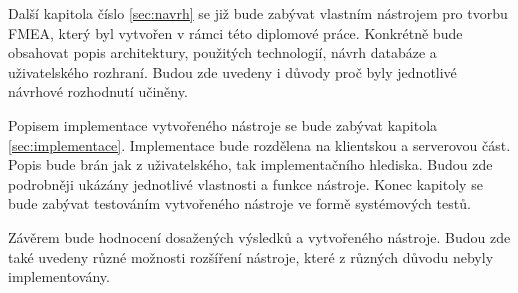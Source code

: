Další kapitola číslo \ref{sec:navrh} se již bude zabývat vlastním nástrojem pro tvorbu FMEA, který byl vytvořen v rámci této diplomové práce. Konkrétně bude obsahovat popis architektury, použitých technologií, návrh databáze a uživatelského rozhraní. Budou zde uvedeny i důvody proč byly jednotlivé návrhové rozhodnutí učiněny. 

Popisem implementace vytvořeného nástroje se bude zabývat kapitola \ref{sec:implementace}. Implementace bude rozdělena na klientskou a serverovou část. Popis bude brán jak z uživatelského, tak implementačního hlediska. Budou zde podrobněji ukázány jednotlivé vlastnosti a funkce nástroje. Konec kapitoly se bude zabývat testováním vytvořeného nástroje ve formě systémových testů. 

Závěrem bude hodnocení dosažených výsledků a vytvořeného nástroje. Budou zde také uvedeny různé možnosti rozšíření nástroje, které z různých důvodu nebyly implementovány. 
\endinput